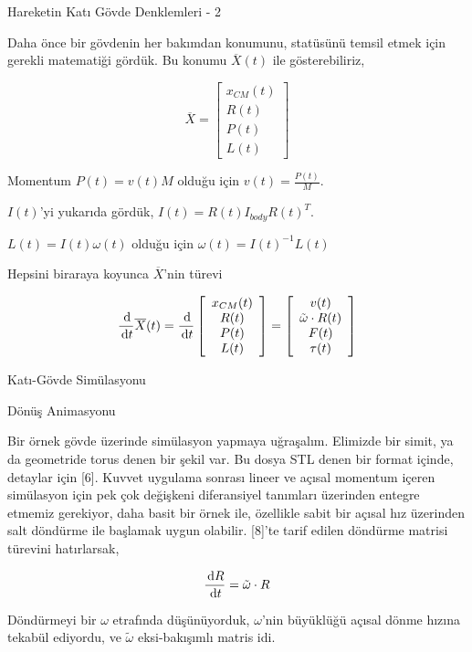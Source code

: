 \documentclass[12pt,fleqn]{article}\usepackage{../../common}
\begin{document}
Hareketin Katı Gövde Denklemleri - 2

Daha önce bir gövdenin her bakımdan konumunu, statüsünü temsil etmek için
gerekli matematiği gördük. Bu konumu $\overline{X}(t)$ ile gösterebiliriz,

$$
\overline{X} = \left[\begin{array}{c}
x_{CM}(t) \\ R(t) \\ P(t) \\ L(t)
\end{array}\right]
$$

Momentum $P(t) = v(t) M$ olduğu için $v(t) = \frac{P(t)}{M}$.

$I(t)$'yi yukarıda gördük, $I(t) = R(t) I_{body} R(t)^T$.

$L(t) = I(t) \omega(t)$ olduğu için $\omega(t) = I(t)^{-1} L(t)$

Hepsini biraraya koyunca $\overline{X}$'nin türevi

$$
\frac{\,\mathrm{d}}{\,\mathrm{d} t} \overline{X}(t) =
\frac{\,\mathrm{d}}{\,\mathrm{d} t}
\left[\begin{array}{c}
x_{CM}(t) \\ R(t) \\ P(t) \\ L(t)
\end{array}\right]
=
\left[\begin{array}{c}
v(t) \\ \tilde \omega \cdot R(t) \\ F(t) \\ \tau(t)
\end{array}\right]
$$

Katı-Gövde Simülasyonu

Dönüş Animasyonu

Bir örnek gövde üzerinde simülasyon yapmaya uğraşalım. Elimizde bir simit, ya da
geometride torus denen bir şekil var. Bu dosya STL denen bir format içinde,
detaylar için [6]. Kuvvet uygulama sonrası lineer ve açısal momentum içeren
simülasyon için pek çok değişkeni diferansiyel tanımları üzerinden entegre
etmemiz gerekiyor, daha basit bir örnek ile, özellikle sabit bir açısal hız
üzerinden salt döndürme ile başlamak uygun olabilir. [8]'te tarif edilen
döndürme matrisi türevini hatırlarsak,

$$
\frac{\,\mathrm{d} R}{\,\mathrm{d} t} = \tilde \omega \cdot R
$$

Döndürmeyi bir $\omega$ etrafında düşünüyorduk, $\omega$'nin büyüklüğü
açısal dönme hızına tekabül ediyordu, ve $\tilde \omega$ eksi-bakışımlı
matris idi.
\end{document}
